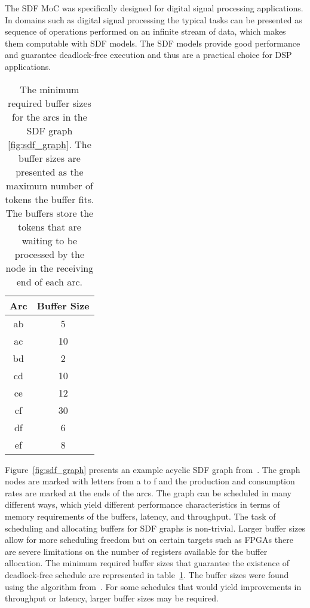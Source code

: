 The SDF MoC was specifically designed for digital signal processing applications. In domains such as digital signal processing the typical tasks can be presented as sequence of operations performed on an infinite stream of data, which makes them computable with SDF models. The SDF models provide good performance and guarantee deadlock-free execution and thus are a practical choice for DSP applications.~\cite{lee2015introduction}

\begin{table}
    \begin{center}
        \begin{tabular}{ c c }
            Arc & Buffer Size \\ \hline
            ab  & 5 \\ \hline
            ac  & 10 \\ \hline
            bd  & 2 \\ \hline
            cd  & 10 \\ \hline
            ce  & 12 \\ \hline
            cf  & 30 \\ \hline
            df  & 6 \\ \hline
            ef  & 8 \\ \hline
        \end{tabular}
        \caption{The minimum required buffer sizes for the arcs in the SDF graph \ref{fig:sdf_graph}. The buffer sizes are presented as the maximum number of tokens the buffer fits. The buffers store the tokens that are waiting to be processed by the node in the receiving end of each arc.}
        \label{tab:sdf_buffers}
    \end{center}
\end{table}

Figure~\ref{fig:sdf_graph} presents an example acyclic SDF graph from~\cite{ade1997data}. The graph nodes are marked with letters from a to f and the production and consumption rates are marked at the ends of the arcs. The graph can be scheduled in many different ways, which yield different performance characteristics in terms of memory requirements of the buffers, latency, and throughput. The task of scheduling and allocating buffers for SDF graphs is non-trivial. Larger buffer sizes allow for more scheduling freedom but on certain targets such as FPGAs there are severe limitations on the number of registers available for the buffer allocation. The minimum required buffer sizes that guarantee the existence of deadlock-free schedule are represented in table~\ref{tab:sdf_buffers}. The buffer sizes were found using the algorithm from~\cite{ade1997data}. For some schedules that would yield improvements in throughput or latency, larger buffer sizes may be required.


